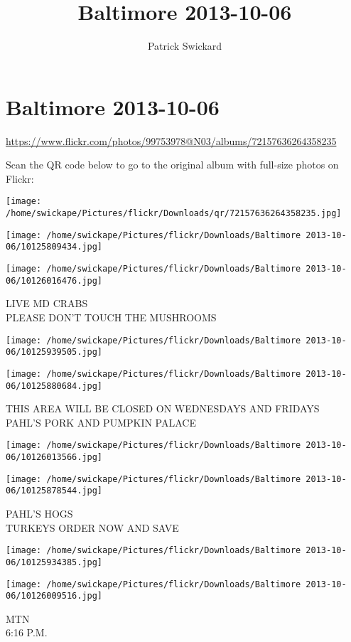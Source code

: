 \documentclass[10pt,letterpaper]{article}
\title{Baltimore 2013-10-06}
\author{Patrick Swickard}
\date{}
\begin{document}
\section*{Baltimore 2013-10-06}

\url{https://www.flickr.com/photos/99753978@N03/albums/72157636264358235}

Scan the QR code below to go to the original album with full-size photos on Flickr:

\texttt{[image: /home/swickape/Pictures/flickr/Downloads/qr/72157636264358235.jpg]}
\pagebreak

\texttt{[image: /home/swickape/Pictures/flickr/Downloads/Baltimore 2013-10-06/10125809434.jpg]}

\vspace{0.25in}
\texttt{[image: /home/swickape/Pictures/flickr/Downloads/Baltimore 2013-10-06/10126016476.jpg]}

LIVE MD CRABS\\
PLEASE DON'T TOUCH THE MUSHROOMS
\pagebreak

\texttt{[image: /home/swickape/Pictures/flickr/Downloads/Baltimore 2013-10-06/10125939505.jpg]}

\vspace{0.25in}
\texttt{[image: /home/swickape/Pictures/flickr/Downloads/Baltimore 2013-10-06/10125880684.jpg]}

THIS AREA WILL BE CLOSED ON WEDNESDAYS AND FRIDAYS\\
PAHL'S PORK AND PUMPKIN PALACE
\pagebreak

\texttt{[image: /home/swickape/Pictures/flickr/Downloads/Baltimore 2013-10-06/10126013566.jpg]}

\vspace{0.25in}
\texttt{[image: /home/swickape/Pictures/flickr/Downloads/Baltimore 2013-10-06/10125878544.jpg]}

PAHL'S HOGS\\
TURKEYS ORDER NOW AND SAVE
\pagebreak

\texttt{[image: /home/swickape/Pictures/flickr/Downloads/Baltimore 2013-10-06/10125934385.jpg]}

\vspace{0.25in}
\texttt{[image: /home/swickape/Pictures/flickr/Downloads/Baltimore 2013-10-06/10126009516.jpg]}

MTN\\
6:16 P.M.
\pagebreak
\end{document}
